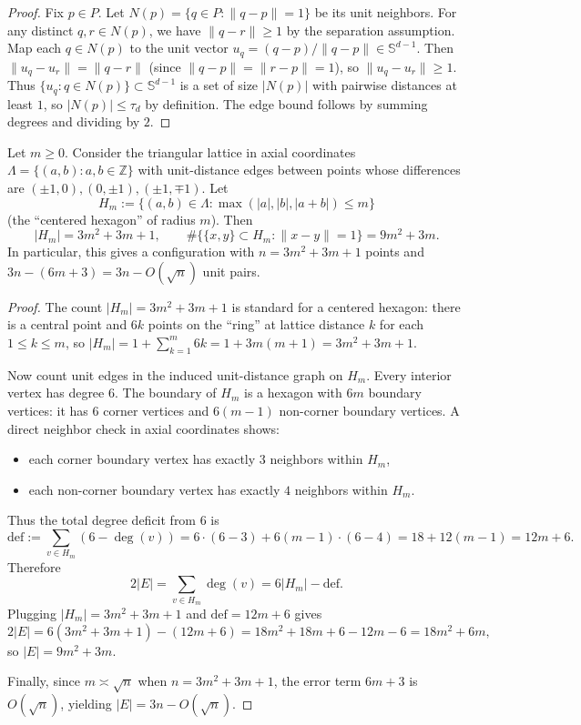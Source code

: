 \begin{proof}
Fix \(p\in P\). Let \(N(p)=\{q\in P: \|q-p\|=1\}\) be its unit neighbors.
For any distinct \(q,r\in N(p)\), we have \(\|q-r\|\ge 1\) by the separation assumption.
Map each \(q\in N(p)\) to the unit vector \(u_q=(q-p)/\|q-p\|\in\mathbb{S}^{d-1}\). Then
\(\|u_q-u_r\|=\|q-r\|\) (since \(\|q-p\|=\|r-p\|=1\)), so \(\|u_q-u_r\|\ge 1\).
Thus \(\{u_q: q\in N(p)\}\subset\mathbb{S}^{d-1}\) is a set of size \(|N(p)|\) with pairwise distances at least \(1\), so \(|N(p)|\le \tau_d\) by definition.
The edge bound follows by summing degrees and dividing by \(2\).
\end{proof}

\begin{lemma}
Let \(m\ge 0\). Consider the triangular lattice in axial coordinates
\(\Lambda=\{(a,b): a,b\in\mathbb{Z}\}\) with unit-distance edges between points whose differences are
\((\pm1,0),(0,\pm1),(\pm1,\mp1)\).
Let
\[
H_m:=\{(a,b)\in\Lambda: \max(|a|,|b|,|a+b|)\le m\}
\]
(the ``centered hexagon'' of radius \(m\)). Then
\[
|H_m|=3m^2+3m+1,\qquad \#\{\{x,y\}\subset H_m: \|x-y\|=1\}=9m^2+3m.
\]
In particular, this gives a configuration with \(n=3m^2+3m+1\) points and \(3n-(6m+3)=3n-O(\sqrt n)\) unit pairs.
\end{lemma}

\begin{proof}
The count \(|H_m|=3m^2+3m+1\) is standard for a centered hexagon: there is a central point and \(6k\) points on the ``ring'' at lattice distance \(k\) for each \(1\le k\le m\), so
\(|H_m|=1+\sum_{k=1}^m 6k=1+3m(m+1)=3m^2+3m+1\).

Now count unit edges in the induced unit-distance graph on \(H_m\). Every interior vertex has degree \(6\).
The boundary of \(H_m\) is a hexagon with \(6m\) boundary vertices: it has \(6\) corner vertices and \(6(m-1)\) non-corner boundary vertices. A direct neighbor check in axial coordinates shows:
\begin{itemize}
\item each corner boundary vertex has exactly \(3\) neighbors within \(H_m\),
\item each non-corner boundary vertex has exactly \(4\) neighbors within \(H_m\).
\end{itemize}
Thus the total degree deficit from \(6\) is
\[
\mathrm{def}:=\sum_{v\in H_m} (6-\deg(v)) = 6\cdot(6-3) + 6(m-1)\cdot(6-4) =18+12(m-1)=12m+6.
\]
Therefore
\[
2|E|=\sum_{v\in H_m}\deg(v)=6|H_m|-\mathrm{def}.
\]
Plugging \(|H_m|=3m^2+3m+1\) and \(\mathrm{def}=12m+6\) gives
\[
2|E|=6(3m^2+3m+1)-(12m+6)=18m^2+18m+6-12m-6=18m^2+6m,
\]
so \(|E|=9m^2+3m\).

Finally, since \(m\asymp \sqrt n\) when \(n=3m^2+3m+1\), the error term \(6m+3\) is \(O(\sqrt n)\), yielding \(|E|=3n-O(\sqrt n)\).
\end{proof}


